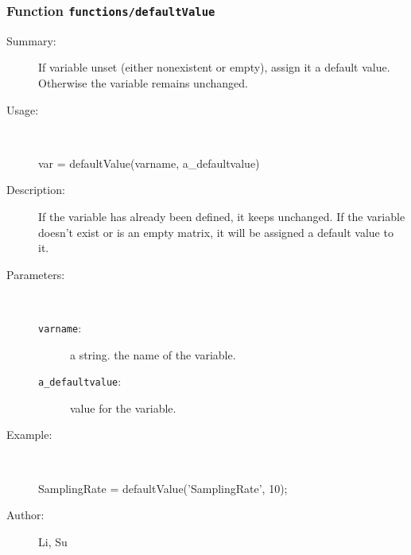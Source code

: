 \subsubsection[Function \texttt{defaultValue}]{Function \texttt{functions/defaultValue}}%
%
\label{ref_functions__defaultValue}%
\hypertarget{ref_functions__defaultValue}{}%
\begin{description}
\item[Summary:]If variable unset (either nonexistent or empty), assign it
 a default value. Otherwise the variable remains unchanged.
%
\item[Usage:]~%
\begin{lyxcode}%
var = defaultValue(varname, a\_defaultvalue)
%
\end{lyxcode}%
%
\item[Description:]%
If the variable has already been defined, it keeps unchanged. If the
 variable doesn't exist or is an empty matrix, it will be assigned a
 default value to it.
\item[Parameters:]~
\begin{description}%
\item[\texttt{varname}:]
 a string. the name of the variable.
\item[\texttt{a\_defaultvalue}:]
 value for the variable.
\end{description}%
%
%
\item[Example:]~
\begin{lyxcode}   SamplingRate = defaultValue('SamplingRate', 10);
\\%
\end{lyxcode}
%
%
\item[Author:]%
Li, Su
%
\end{description}
\methodline%
